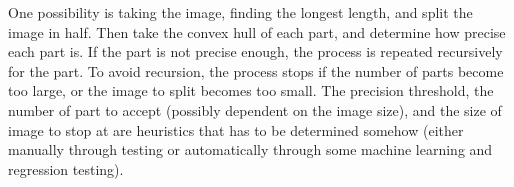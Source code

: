One possibility is taking the image, finding the longest length, and split the image
in half. Then take the convex hull of each part, and determine how precise each
part is. If the part is not precise enough, the process is repeated recursively for the part.
To avoid recursion, the process stops if the number of parts become too large, or the image
to split becomes too small.
The precision threshold, the number of part to accept (possibly dependent on the image size),
and the size of image to stop at are heuristics that has to be determined somehow
(either manually through testing or automatically through some machine learning and regression
testing).

